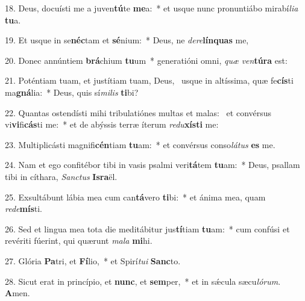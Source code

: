 18. Deus, docuísti me a juven\textbf{tú}te \textbf{me}a:~*  et usque nunc pronuntiábo mirabí\textit{li}\textit{a} \textbf{tu}a.\

19. Et usque in se\textbf{néc}tam et \textbf{sé}nium:~*  Deus, ne \textit{de}\textit{re}\textbf{lín}\textbf{quas} me,\

20. Donec annúntiem \textbf{brá}chium \textbf{tu}um~*  generatióni omni, \textit{quæ} \textit{ven}\textbf{tú}\textbf{ra} est:\

21. Poténtiam tuam, et justítiam tuam, Deus, \dag\  usque in altíssima, quæ fe\textbf{cís}ti ma\textbf{gná}lia:~*  Deus, quis sí\textit{mi}\textit{lis} \textbf{ti}bi?\

22. Quantas ostendísti mihi tribulatiónes multas et malas: \dag\  et convérsus vi\textbf{vi}fi\textbf{cás}ti me:~*  et de abýssis terræ íterum \textit{re}\textit{du}\textbf{xís}\textbf{ti} me:\

23. Multiplicásti magnifi\textbf{cén}tiam \textbf{tu}am:~*  et convérsus conso\textit{lá}\textit{tus} \textbf{es} me.\

24. Nam et ego confitébor tibi in vasis psalmi veri\textbf{tá}tem \textbf{tu}am:~*  Deus, psallam tibi in cíthara, \textit{Sanc}\textit{tus} \textbf{Is}\textbf{ra}ël.\

25. Exsultábunt lábia mea cum can\textbf{tá}vero \textbf{ti}bi:~*  et ánima mea, quam \textit{red}\textit{e}\textbf{mís}ti.\

26. Sed et lingua mea tota die meditábitur jus\textbf{tí}tiam \textbf{tu}am:~*  cum confúsi et revériti fúerint, qui quærunt \textit{ma}\textit{la} \textbf{mi}hi.\

27. Glória \textbf{Pa}tri, et \textbf{Fí}lio,~*  et Spirí\textit{tu}\textit{i} \textbf{Sanc}to.\

28. Sicut erat in princípio, et \textbf{nunc}, et \textbf{sem}per,~*  et in sǽcula sæcu\textit{ló}\textit{rum}. \textbf{A}men.\


